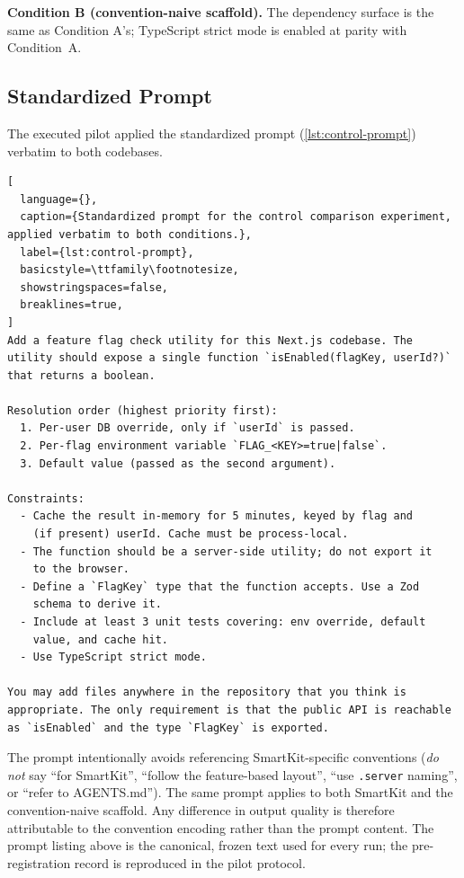 \documentclass[12pt,a4paper]{report}
\DeclareRobustCommand{\filename}[1]{\bgroup\urlstyle{tt}\nolinkurl{#1}\egroup}
\begin{document}
\medskip\noindent\textbf{Condition B (convention-naive scaffold).} The dependency surface is the same as Condition A's; TypeScript strict mode is enabled at parity with Condition~A.

\subsection{Standardized Prompt}
\label{sec:standardized-prompt}

The executed pilot applied the standardized prompt (\autoref{lst:control-prompt}) verbatim to both codebases.

\newpage

\begin{lstlisting}[
  language={},
  caption={Standardized prompt for the control comparison experiment, applied verbatim to both conditions.},
  label={lst:control-prompt},
  basicstyle=\ttfamily\footnotesize,
  showstringspaces=false,
  breaklines=true,
]
Add a feature flag check utility for this Next.js codebase. The
utility should expose a single function `isEnabled(flagKey, userId?)`
that returns a boolean.

Resolution order (highest priority first):
  1. Per-user DB override, only if `userId` is passed.
  2. Per-flag environment variable `FLAG_<KEY>=true|false`.
  3. Default value (passed as the second argument).

Constraints:
  - Cache the result in-memory for 5 minutes, keyed by flag and
    (if present) userId. Cache must be process-local.
  - The function should be a server-side utility; do not export it
    to the browser.
  - Define a `FlagKey` type that the function accepts. Use a Zod
    schema to derive it.
  - Include at least 3 unit tests covering: env override, default
    value, and cache hit.
  - Use TypeScript strict mode.

You may add files anywhere in the repository that you think is
appropriate. The only requirement is that the public API is reachable
as `isEnabled` and the type `FlagKey` is exported.
\end{lstlisting}

The prompt intentionally avoids referencing SmartKit-specific conventions (\emph{do not} say ``for SmartKit'', ``follow the feature-based layout'', ``use \filename{.server} naming'', or ``refer to AGENTS.md''). The same prompt applies to both SmartKit and the convention-naive scaffold. Any difference in output quality is therefore attributable to the convention encoding rather than the prompt content. The prompt listing above is the canonical, frozen text used for every run; the pre-registration record is reproduced in the pilot protocol.
\end{document}
